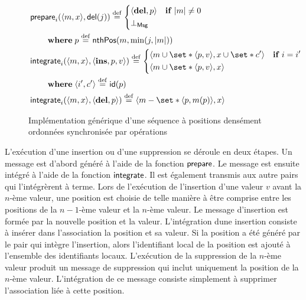 \begin{figure}[htb]
\begin{align}
%
&\begin{aligned}
\MoveEqLeft \trm{prepare}_i(\tuple*{m,x}, \trm{del}(j)) \defeq%
\begin{dcases}
\tuple*{\textbf{del}, p} & \when \card*{m} \neq 0\\
\bot_{\trm{Msg}} &
\end{dcases}\\
&\where p \defeq \trm{nthPos}(m, \min(j, \card*{m}))\\
\end{aligned}\\
%
&\begin{aligned}
\MoveEqLeft \trm{integrate}_i(\tuple*{m, x}, \tuple*{\textbf{ins}, p, v}) \defeq%
\begin{dcases}
    \tuple*{m \cup \set*{\tuple*{p, v}}, x \cup \set*{c'}} & \when i = i'\\
    \tuple*{m \cup \set*{\tuple*{p, v}}, x} &
\end{dcases}\\
&\where \tuple*{i', c'} \defeq \trm{id}(p)
\end{aligned}\\
%
&\trm{integrate}_i(\tuple*{m, x}, \tuple*{\textbf{del}, p}) \defeq%
\tuple*{m \sminus \set*{\tuple*{p, m(p)}}, x}
%
\end{align}
\caption{Implémentation générique d'une séquence à positions densément ordonnées synchronisée par opérations}\label{fig:op-densely-id-repseq}
\end{figure}

L'exécution d'une insertion ou d'une suppression se déroule en deux étapes.
Un message est d'abord généré à l'aide de la fonction $\operatorname{\mathsf{prepare}}$.
Le message est ensuite intégré à l'aide de la fonction $\operatorname{\mathsf{integrate}}$. Il est également transmis aux autre pairs qui l'intégrèrent à terme.
Lors de l'exécution de l'insertion d'une valeur $v$ avant la $n$-ème valeur, une position est choisie de telle manière à être comprise entre les positions de la $n-1$-ème valeur et la $n$-ème valeur.
Le message d'insertion est formée par la nouvelle position et la valeur.
L'intégration dune insertion consiste à insérer dans l'association la position et sa valeur.
Si la position a été généré par le pair qui intègre l'insertion, alors l'identifiant local de la position est ajouté à l'ensemble des identifiants locaux.
L'exécution de la suppression de la $n$-ème valeur produit un message de suppression qui inclut uniquement la position de la $n$-ème valeur.
L'intégration de ce message consiste simplement à supprimer l'association liée à cette position.

